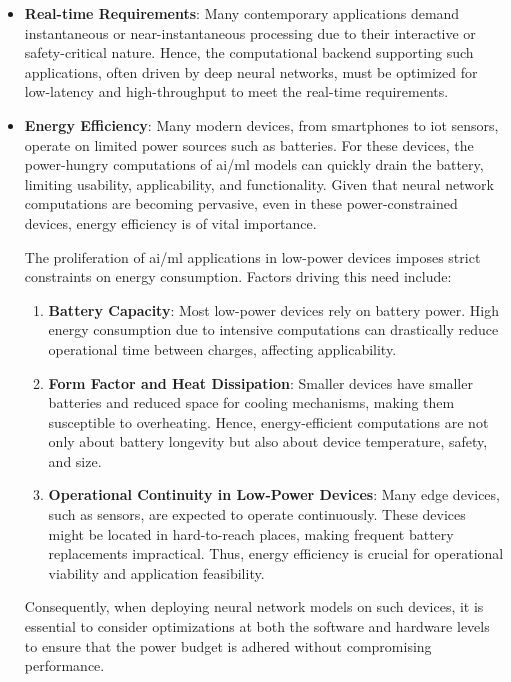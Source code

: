 \begin{itemize}
	\item \textbf{Real-time Requirements}:
	Many contemporary applications demand instantaneous or near-instantaneous processing due to their interactive or safety-critical nature. Hence, the computational backend supporting such applications, often driven by deep neural networks, must be optimized for low-latency and high-throughput to meet the real-time requirements.
	
	\item \textbf{Energy Efficiency}: Many modern devices, from smartphones to \gls{iot} sensors, operate on limited power sources such as batteries. For these devices, the power-hungry computations of \gls{ai}/\gls{ml} models can quickly drain the battery, limiting usability, applicability, and functionality. Given that neural network computations are becoming pervasive, even in these power-constrained devices, energy efficiency is of vital importance.
	
	The proliferation of \gls{ai}/\gls{ml} applications in low-power devices imposes strict constraints on energy consumption. Factors driving this need include:
	
	\begin{enumerate}
		\item \textbf{Battery Capacity}: Most low-power devices rely on battery power. High energy consumption due to intensive computations can drastically reduce operational time between charges, affecting applicability.
		
		\item \textbf{Form Factor and Heat Dissipation}: Smaller devices have smaller batteries and reduced space for cooling mechanisms, making them susceptible to overheating. Hence, energy-efficient computations are not only about battery longevity but also about device temperature, safety, and size.
		
		\item \textbf{Operational Continuity in Low-Power Devices}: Many edge devices, such as sensors, are expected to operate continuously. These devices might be located in hard-to-reach places, making frequent battery replacements impractical. Thus, energy efficiency is crucial for operational viability and application feasibility.
	\end{enumerate}
	
	Consequently, when deploying neural network models on such devices, it is essential to consider optimizations at both the software and hardware levels to ensure that the power budget is adhered without compromising performance.
	
\end{itemize}

